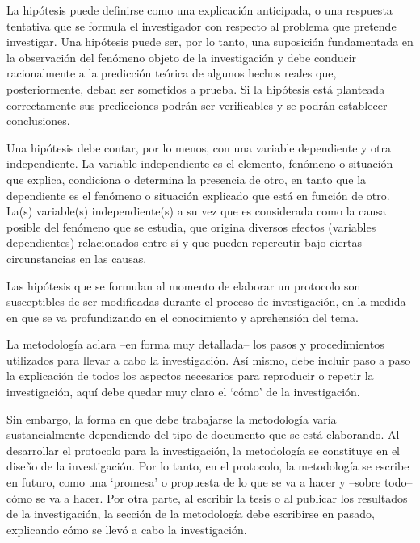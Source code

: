 \documentclass[10pt,a4paper]{protocol}
\begin{document}
La hipótesis puede definirse como una explicación anticipada, o una respuesta tentativa que se formula el investigador con respecto al problema que pretende investigar. Una hipótesis puede ser, por lo tanto, una suposición fundamentada en la observación del fenómeno objeto de la investigación y debe conducir racionalmente a la predicción teórica de algunos hechos reales que, posteriormente, deban ser sometidos a prueba. Si la hipótesis está planteada correctamente sus predicciones podrán ser verificables y se podrán establecer conclusiones.\\ \vspace*{0.5cm}


Una hipótesis debe contar, por lo menos, con una variable dependiente y otra independiente. La variable independiente es el elemento, fenómeno o situación que explica, condiciona o determina la presencia de otro, en tanto que la dependiente es el fenómeno o situación explicado que está en función de otro. La(s) variable(s) independiente(s) a su vez que es considerada como la causa posible del fenómeno que se estudia, que origina diversos efectos (variables dependientes) relacionados entre sí y que pueden repercutir bajo ciertas circunstancias en las causas.\\ \vspace*{0.5cm}

Las hipótesis que se formulan al momento de elaborar un protocolo son susceptibles de ser modificadas durante el proceso de investigación, en la medida en que se va profundizando en el conocimiento y aprehensión del tema.


La metodología aclara –en forma muy detallada– los pasos y procedimientos utilizados para llevar a cabo la investigación. Así mismo, debe incluir paso a paso la explicación de todos los aspectos necesarios para reproducir o repetir la investigación, aquí debe quedar muy claro el ‘cómo’ de la investigación.\\ \vspace*{0.5cm}

Sin embargo, la forma en que debe trabajarse la metodología varía sustancialmente dependiendo del tipo de documento que se está elaborando. Al desarrollar el protocolo para la investigación, la metodología se constituye en el diseño de la investigación. Por lo tanto, en el protocolo, la metodología se escribe en futuro, como una ‘promesa’ o propuesta de lo que se va a hacer y –sobre todo– cómo se va a hacer. Por otra parte, al escribir la tesis o al publicar los resultados de la investigación, la sección de la metodología debe escribirse en pasado, explicando cómo se llevó a cabo la investigación.\\ \vspace*{0.5cm}
\end{document}
